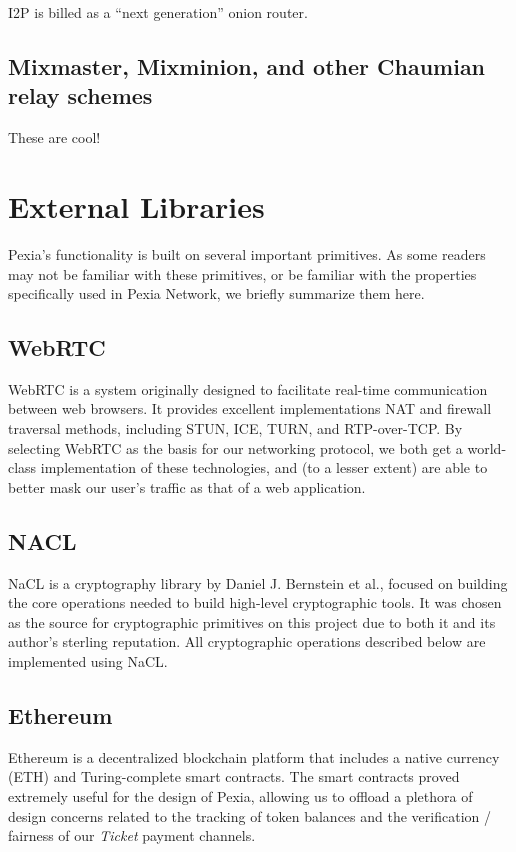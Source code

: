 \documentclass{article}
\newcommand{\mesh}{Pexia}
\begin{document}
I2P is billed as a “next generation” onion router.

\subsection{Mixmaster, Mixminion, and other Chaumian relay schemes}

These are cool!


\section{External Libraries}
\label{sec:external-libraries}

\mesh{}’s functionality is built on several important primitives. As some readers may not be familiar with these primitives, or be familiar with the properties specifically used in \mesh{} Network, we briefly summarize them here.

\subsection{WebRTC}

WebRTC \cite{webrtc} is a system originally designed to facilitate real-time communication between web browsers. It provides excellent implementations NAT and firewall traversal methods, including STUN, ICE, TURN, and RTP-over-TCP. By selecting WebRTC as the basis for our networking protocol, we both get a world-class implementation of these technologies, and (to a lesser extent) are able to better mask our user's traffic as that of a web application.

\subsection{NACL}

NaCL \cite{nacl} is a cryptography library by Daniel J. Bernstein et al., focused on building the core operations needed to build high-level cryptographic tools. It was chosen as the source for cryptographic primitives on this project due to both it and its author's sterling reputation. All cryptographic operations described below are implemented using NaCL.

\subsection{Ethereum}

Ethereum \cite{29} is a decentralized blockchain platform that includes a native currency (ETH) and Turing-complete smart contracts. The smart contracts proved extremely useful for the design of \mesh{}, allowing us to offload a plethora of design concerns related to the tracking of token balances and the verification / fairness of our \emph{Ticket} payment channels.
\end{document}
